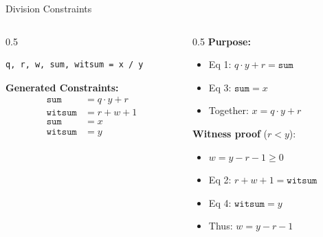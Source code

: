 \documentclass[aspectratio=169,11pt]{beamer}
\begin{document}
\begin{frame}[fragile]{Division Constraints}

\begin{columns}
\begin{column}{0.5\textwidth}
\begin{lstlisting}[style=zkasm]
q, r, w, sum, witsum = x / y
\end{lstlisting}

\textbf{Generated Constraints:}
\begin{align*}
\texttt{sum} &= q \cdot y + r \\
\texttt{witsum} &= r + w + 1 \\
\texttt{sum} &= x \\
\texttt{witsum} &= y
\end{align*}
\end{column}

\begin{column}{0.5\textwidth}
\textbf{Purpose:}
\begin{itemize}
    \item Eq 1: $q \cdot y + r = \texttt{sum}$
    \item Eq 3: $\texttt{sum} = x$
    \item Together: $x = q \cdot y + r$
\end{itemize}

\vspace{0.5em}
\textbf{Witness proof} ($r < y$):
\begin{itemize}
    \item $w = y - r - 1 \geq 0$
    \item Eq 2: $r + w + 1 = \texttt{witsum}$
    \item Eq 4: $\texttt{witsum} = y$
    \item Thus: $w = y - r - 1$
\end{itemize}
\end{column}
\end{columns}
\end{frame}
\end{document}
